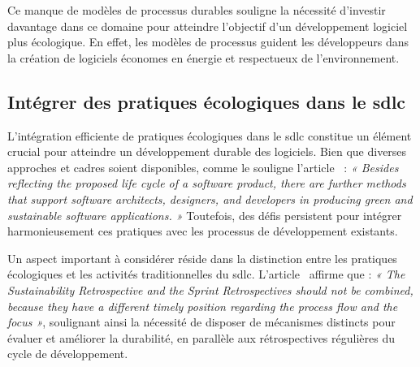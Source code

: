 Ce manque de modèles de processus durables souligne la nécessité d'investir davantage dans ce domaine pour atteindre l'objectif d'un développement logiciel plus écologique. En effet, les modèles de processus guident les développeurs dans la création de logiciels économes en énergie et respectueux de l'environnement.


\subsection{Intégrer des pratiques écologiques dans le \acrfull{sdlc}}
L'intégration efficiente de pratiques écologiques dans le \acrshort{sdlc} constitue un élément crucial pour atteindre un développement durable des logiciels. Bien que diverses approches et cadres soient disponibles, comme le souligne l'article~\cite{GreenSoftModel} : \emph{« Besides reflecting the proposed life cycle of a software product, there are further methods that support software architects, designers, and developers in producing green and sustainable software applications. »} Toutefois, des défis persistent pour intégrer harmonieusement ces pratiques avec les processus de développement existants.


Un aspect important à considérer réside dans la distinction entre les pratiques écologiques et les activités traditionnelles du \acrshort{sdlc}. L'article~\cite{GreenAgileMethods} affirme que : \emph{« The Sustainability Retrospective and the Sprint Retrospectives should not be combined, because they have a different timely position regarding the process flow and the focus »}, soulignant ainsi la nécessité de disposer de mécanismes distincts pour évaluer et améliorer la durabilité, en parallèle aux rétrospectives régulières du cycle de développement.


